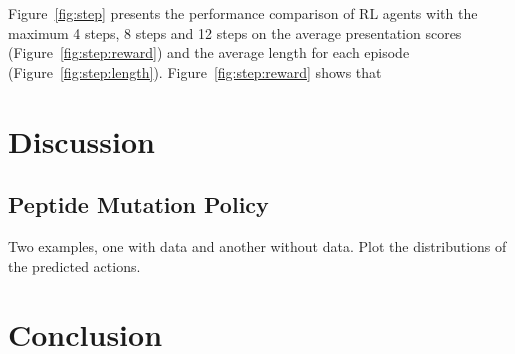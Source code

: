 \documentclass[letterpaper]{article}
\begin{document}
Figure~\ref{fig:step} presents the performance comparison of RL agents with the maximum 4 steps, 8 steps and 12 steps
on the average presentation scores (Figure~\ref{fig:step:reward}) and the average length for each episode (Figure~\ref{fig:step:length}).
%
Figure~\ref{fig:step:reward} shows that 


\section{Discussion}
\label{sec:dis}

\subsection{Peptide Mutation Policy}
\label{sec:dis:policy}

Two examples, one with data and another without data. Plot the distributions of the predicted actions.

\section{Conclusion}
\label{sec:conclusion}



\end{document}
